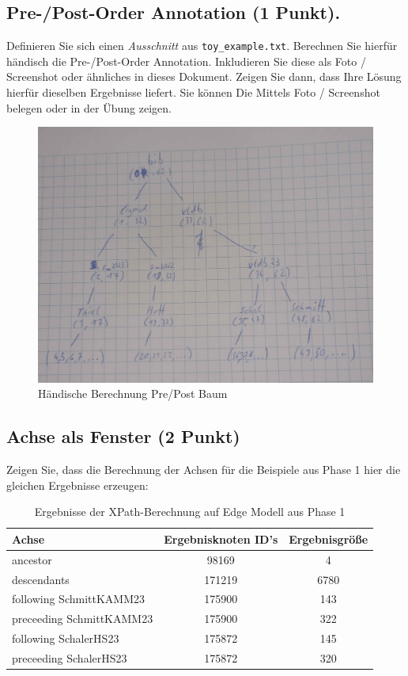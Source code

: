 \documentclass[11pt]{scrartcl}
\begin{document}
\subsection*{Pre-/Post-Order Annotation (1 Punkt).}
Definieren Sie sich einen \textit{Ausschnitt} aus \texttt{toy\_example.txt}.
Berechnen Sie hierfür händisch die Pre-/Post-Order Annotation.
Inkludieren Sie diese als Foto / Screenshot oder ähnliches in dieses Dokument.
Zeigen Sie dann, dass Ihre Lösung hierfür dieselben Ergebnisse liefert.
Sie können Die Mittels Foto / Screenshot belegen oder in der Übung zeigen.

\begin{figure}[H]
	\includegraphics[width=\linewidth]{PrePostBaum.png}
	\caption{Händische Berechnung Pre/Post Baum}\label{fig:node}
\end{figure}

\newpage

\subsection*{Achse als Fenster (2 Punkt)}
Zeigen Sie, dass die Berechnung der Achsen für die Beispiele aus Phase 1 hier die gleichen Ergebnisse erzeugen:

\begin{table}[h]
	\centering
		\begin{center}
			\begin{tabular}{ l | c c }
				\toprule
				Achse & Ergebnisknoten ID's & Ergebnisgröße\\
				\midrule
				ancestor & 98169 & 4 \\
				descendants & 171219 & 6780 \\
				following SchmittKAMM23 & 175900 & 143 \\
				preceeding SchmittKAMM23 & 175900 & 322 \\
				following SchalerHS23 & 175872 & 145 \\
				preceeding SchalerHS23 & 175872 & 320 \\
				\bottomrule
			\end{tabular}
			\end{center}
	\caption{Ergebnisse der XPath-Berechnung auf Edge Modell aus Phase 1}
	\label{tab:ErgebnisseDerXPathBerechnug}
\end{table}
\end{document}
